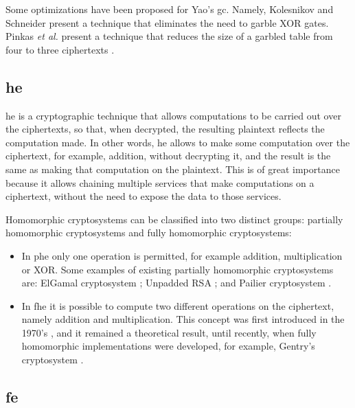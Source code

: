 Some optimizations have been proposed for Yao's \ac{gc}. Namely, Kolesnikov and Schneider \cite{kolesnikov2008improved} present a technique that eliminates the need to garble XOR gates. Pinkas \textit{et al.} present a technique that reduces the size of a garbled table from four to three ciphertexts \cite{pinkas2009secure}.


\subsection{\acl{he}}
\label{ssec:HomomorphicEncryption}


\acf{he} \cite{rivest1978data} is a cryptographic technique that allows computations to be carried out over the ciphertexts, so that, when decrypted, the resulting plaintext reflects the computation made. In other words, \ac{he} allows to make some computation over the ciphertext, for example, addition, without decrypting it, and the result is the same as making that computation on the plaintext. This is of great importance because it allows chaining multiple services that make computations on a ciphertext, without the need to expose the data to those services. 

Homomorphic cryptosystems can be classified into two distinct groups: partially homomorphic cryptosystems and fully homomorphic cryptosystems:

\begin{itemize}
    
    \item In \ac{phe} only one operation is permitted, for example addition, multiplication or XOR. Some examples of existing partially homomorphic cryptosystems are:
    ElGamal cryptosystem \cite{elgamal1985public}; Unpadded RSA \cite{rivest1978method}; and Pailier cryptosystem \cite{paillier1999public}.

    \item In \ac{fhe} it is possible to compute two different operations on the ciphertext, namely addition and multiplication. This concept was first introduced in the 1970's \cite{rivest1978data}, and it remained a theoretical result, until recently, when fully homomorphic implementations were developed, for example, Gentry's cryptosystem \cite{gentry2009fully}.
\end{itemize}


\subsection{\acl{fe}}
\label{ssec:FunctionalEncryption}


